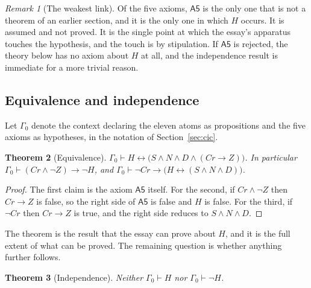 \documentclass[11pt]{article}
\theoremstyle{plain}
\newtheorem{theorem}{Theorem}[section]
\theoremstyle{definition}
\theoremstyle{remark}
\newtheorem{remark}[theorem]{Remark}
\newcommand{\Hyp}{H}
\begin{document}
\begin{remark}[The weakest link]\label{rem:a5}
Of the five axioms, $\mathsf{A5}$ is the only one that is not a theorem of an earlier section, and it is the only one in which $\Hyp$ occurs. It is assumed and not proved. It is the single point at which the essay's apparatus touches the hypothesis, and the touch is by stipulation. If $\mathsf{A5}$ is rejected, the theory below has no axiom about $\Hyp$ at all, and the independence result is immediate for a more trivial reason.
\end{remark}

\subsection{Equivalence and independence}

Let $\Gamma_0$ denote the context declaring the eleven atoms as propositions and the five axioms as hypotheses, in the notation of Section~\ref{sec:cic}.

\begin{theorem}[Equivalence]\label{thm:equiv}
$\Gamma_0\vdash\Hyp\leftrightarrow\bigl(S\land N\land D\land(\mathit{Cr}\to Z)\bigr)$. In particular $\Gamma_0\vdash(\mathit{Cr}\land\neg Z)\to\neg\Hyp$, and $\Gamma_0\vdash\neg\mathit{Cr}\to\bigl(\Hyp\leftrightarrow(S\land N\land D)\bigr)$.
\end{theorem}

\begin{proof}
The first claim is the axiom $\mathsf{A5}$ itself. For the second, if $\mathit{Cr}\land\neg Z$ then $\mathit{Cr}\to Z$ is false, so the right side of $\mathsf{A5}$ is false and $\Hyp$ is false. For the third, if $\neg\mathit{Cr}$ then $\mathit{Cr}\to Z$ is true, and the right side reduces to $S\land N\land D$. \qedhere
\end{proof}

The theorem is the result that the essay can prove about $\Hyp$, and it is the full extent of what can be proved. The remaining question is whether anything further follows.

\begin{theorem}[Independence]\label{thm:indep}
Neither $\Gamma_0\vdash\Hyp$ nor $\Gamma_0\vdash\neg\Hyp$.
\end{theorem}
\end{document}
